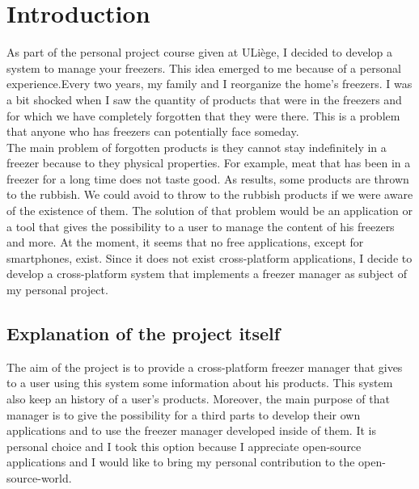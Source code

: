 \section{Introduction}
As part of the personal project course given at ULiège, I decided to develop a system to manage your freezers. This idea emerged to me because of a personal experience.Every two years, my family and I reorganize the home's freezers. I was a bit shocked when I saw the quantity of products that were in the freezers and for which we have completely forgotten that they were there. This is a problem that anyone who has freezers can potentially face someday. \\

The main problem of forgotten products is they cannot stay indefinitely in a freezer because to they physical properties. For example, meat that has been in a freezer for a long time does not taste good. As results, some products are thrown to the rubbish. We could avoid to throw to the rubbish products if we were aware of the existence of them. The solution of that problem would be an application or a tool that gives the possibility to a user to manage the content of his freezers and more. At the moment, it seems that no free applications, except for smartphones, exist. Since it does not exist cross-platform applications, I decide to develop a cross-platform system that implements a freezer manager as subject of my personal project.

\subsection{Explanation of the project itself}
The aim of the project is to provide a cross-platform freezer manager that gives to a user using this system some information about his products. This system also keep an history of a user's products. Moreover, the main purpose of that manager is to give the possibility for a third parts to develop their own applications and to use the freezer manager developed inside of them. It is personal choice and I took this option because I appreciate open-source applications and I would like to bring my personal contribution to the open-source-world. \\

